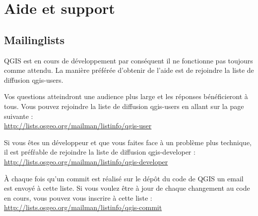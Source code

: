 
\section{Aide et support}\label{label_helpsupport}


\subsection{Mailinglists}
QGIS est en cours de d\'eveloppement par cons\'equent il ne fonctionne pas toujours
comme attendu. La mani\`ere pr\'ef\'er\'ee d'obtenir de l'aide est de rejoindre la
liste de diffusion qgis-users.

Vos questions atteindront une audience plus large et les r\'eponses b\'en\'eficieront
\`a tous. Vous pouvez rejoindre la liste de diffusion qgis-users en allant sur la
page suivante : \\
\url{http://lists.osgeo.org/mailman/listinfo/qgis-user}

Si vous \^etes un d\'eveloppeur et que vous faites face \`a un probl\`eme plus
technique, il est pr\'ef\'rable de rejoindre la liste de diffusion qgis-developer :\\
\url{http://lists.osgeo.org/mailman/listinfo/qgis-developer}

\`A chaque fois qu'un commit est r\'ealis\'e sur le d\'ep\^ot du code de QGIS un email
est envoy\'e \`a cette liste. Si vous voulez \^etre \`a jour de chaque changement au
code en cours, vous pouvez vous inscrire \`a cette liste :\\
\url{http://lists.osgeo.org/mailman/listinfo/qgis-commit}

